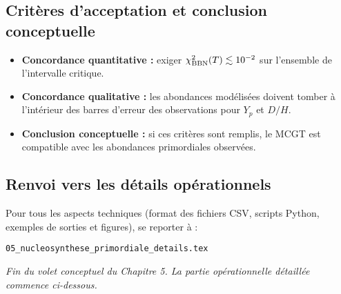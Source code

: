 \subsection{Critères d’acceptation et conclusion conceptuelle}

\begin{itemize}
  \item \textbf{Concordance quantitative :}
    exiger \(\chi^{2}_{\rm BBN}(T)\lesssim10^{-2}\) sur l’ensemble de l’intervalle critique.
  \item \textbf{Concordance qualitative :}
    les abondances modélisées doivent tomber à l’intérieur des barres d’erreur des observations pour \(Y_{p}\) et \(D/H\).
  \item \textbf{Conclusion conceptuelle :}
    si ces critères sont remplis, le MCGT est compatible avec les abondances primordiales observées.
\end{itemize}

\subsection{Renvoi vers les détails opérationnels}

Pour tous les aspects techniques (format des fichiers CSV, scripts Python, exemples de sorties et figures), se reporter à :

\begin{center}
  \texttt{05\_nucleosynthese\_primordiale\_details.tex}
\end{center}

\noindent\emph{Fin du volet conceptuel du Chapitre 5. La partie opérationnelle détaillée commence ci-dessous.}
